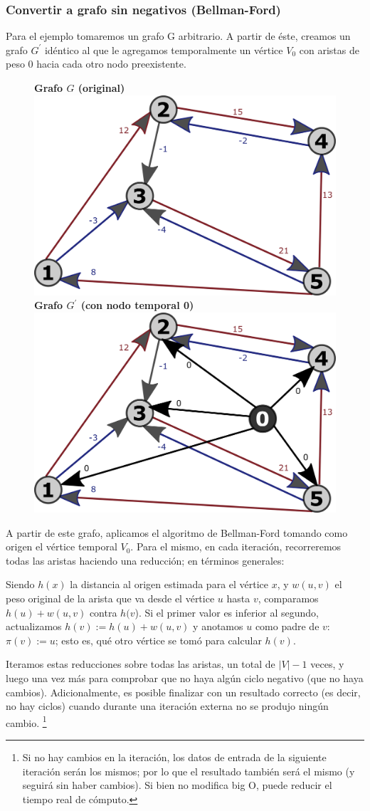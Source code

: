 \documentclass[../tp2_grupo404.tex]{subfiles}
\begin{document}
\subsubsection{Convertir a grafo sin negativos (Bellman-Ford)}
Para el ejemplo tomaremos un grafo G arbitrario. A partir de éste, creamos
un grafo $G^\prime$ idéntico al que le agregamos temporalmente un vértice
$V_0$ con aristas de peso $0$ hacia cada otro nodo preexistente.

\begin{figure}[H]
    \centering
    \subcaptionbox
        {\label{fig:grafoG}\textbf{Grafo $G$ (original)}}
        {\includegraphics[width=0.4\linewidth,angle=0,origin=c]{out/ford/ford1A.png}}
    \subcaptionbox
        {\label{fig:grafoG_prima}\textbf{Grafo $G^\prime$ (con nodo temporal 0)}}
        {\includegraphics[width=0.4\linewidth,angle=0,origin=c]{out/ford/ford1B.png}}
\end{figure}

A partir de este grafo, aplicamos el algoritmo de Bellman-Ford tomando
como origen el vértice temporal $V_0$. Para el mismo, en cada iteración,
recorreremos todas las aristas haciendo una reducción;
en términos generales:
\begin{displayquote}
Siendo $h(x)$ la distancia al origen estimada para el vértice $x$,
y $w(u,v)$ el peso original de la arista que va desde el vértice $u$ hasta $v$,
comparamos $h(u)+w(u,v)$ contra $h(v$). Si el primer valor es inferior al
segundo, actualizamos $h(v) := h(u)+w(u,v)$ y anotamos $u$ como padre de $v$:
$\pi(v):=u$; esto es, qué otro vértice se tomó para calcular $h(v)$.
\end{displayquote}

Iteramos estas reducciones sobre todas las aristas, un total de
$\lvert V \rvert-1$ veces, y luego una vez más para comprobar que
no haya algún ciclo negativo (que no haya cambios). Adicionalmente,
es posible finalizar con un resultado correcto (es decir, no hay ciclos)
cuando durante una iteración externa no se produjo ningún cambio.
\footnote{Si no hay cambios en la iteración, los datos de entrada de
la siguiente iteración serán los mismos; por lo que el resultado también
será el mismo (y seguirá sin haber cambios). Si bien no modifica
big O, puede reducir el tiempo real de cómputo.}
\end{document}

